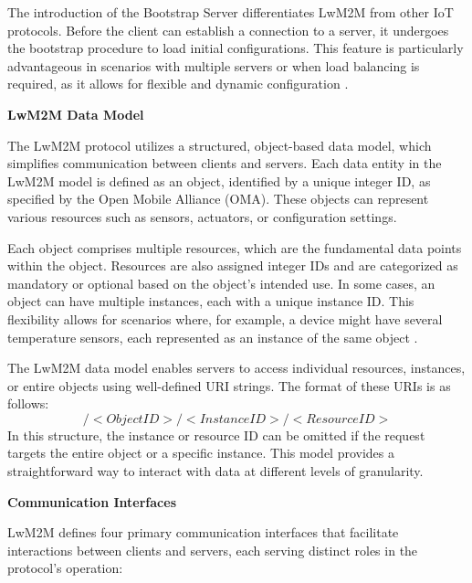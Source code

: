 \documentclass[11pt,sigconf]{iabart}
\begin{document}
The introduction of the Bootstrap Server differentiates LwM2M from other IoT protocols. Before the client can establish a connection to a server, it undergoes the bootstrap procedure to load initial configurations. This feature is particularly advantageous in scenarios with multiple servers or when load balancing is required, as it allows for flexible and dynamic configuration \cite{pop00006}.

\textbf{LwM2M Data Model}

The LwM2M protocol utilizes a structured, object-based data model, which simplifies communication between clients and servers. Each data entity in the LwM2M model is defined as an object, identified by a unique integer ID, as specified by the Open Mobile Alliance (OMA). These objects can represent various resources such as sensors, actuators, or configuration settings.

Each object comprises multiple resources, which are the fundamental data points within the object. Resources are also assigned integer IDs and are categorized as mandatory or optional based on the object's intended use. In some cases, an object can have multiple instances, each with a unique instance ID. This flexibility allows for scenarios where, for example, a device might have several temperature sensors, each represented as an instance of the same object \cite{pop00006}.

The LwM2M data model enables servers to access individual resources, instances, or entire objects using well-defined URI strings. The format of these URIs is as follows:
\[
/<Object ID>/<Instance ID>/<Resource ID>
\]
In this structure, the instance or resource ID can be omitted if the request targets the entire object or a specific instance. This model provides a straightforward way to interact with data at different levels of granularity.

\textbf{Communication Interfaces}

LwM2M defines four primary communication interfaces that facilitate interactions between clients and servers, each serving distinct roles in the protocol's operation:
\end{document}
